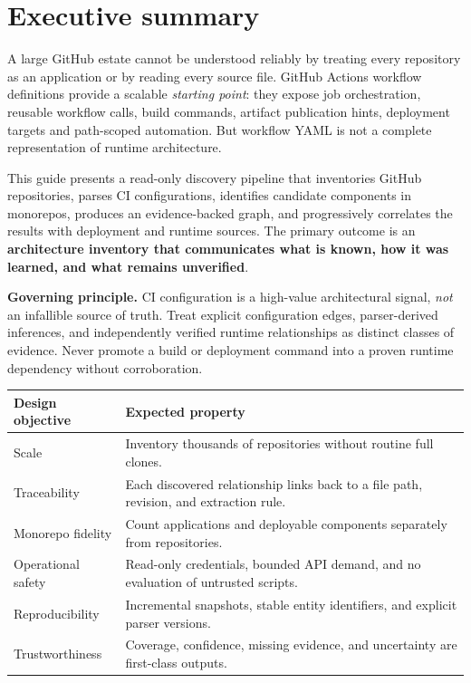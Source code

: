 \documentclass[11pt,letterpaper]{article}
\newcommand{\term}[1]{\textbf{\color{Navy}#1}}
\begin{document}
\section*{Executive summary}
A large GitHub estate cannot be understood reliably by treating every repository as an application or by reading every source file. GitHub Actions workflow definitions provide a scalable \emph{starting point}: they expose job orchestration, reusable workflow calls, build commands, artifact publication hints, deployment targets and path-scoped automation. But workflow YAML is not a complete representation of runtime architecture.

This guide presents a read-only discovery pipeline that inventories GitHub repositories, parses CI configurations, identifies candidate components in monorepos, produces an evidence-backed graph, and progressively correlates the results with deployment and runtime sources. The primary outcome is an \term{architecture inventory that communicates what is known, how it was learned, and what remains unverified}.

\begin{keypoint}
\textbf{Governing principle.} CI configuration is a high-value architectural signal, \emph{not} an infallible source of truth. Treat explicit configuration edges, parser-derived inferences, and independently verified runtime relationships as distinct classes of evidence. Never promote a build or deployment command into a proven runtime dependency without corroboration.
\end{keypoint}

\begin{tabularx}{\linewidth}{@{}P{1.7in}Y@{}}
\toprule
\textbf{Design objective} & \textbf{Expected property} \\
\midrule
Scale & Inventory thousands of repositories without routine full clones. \\
Traceability & Each discovered relationship links back to a file path, revision, and extraction rule. \\
Monorepo fidelity & Count applications and deployable components separately from repositories. \\
Operational safety & Read-only credentials, bounded API demand, and no evaluation of untrusted scripts. \\
Reproducibility & Incremental snapshots, stable entity identifiers, and explicit parser versions. \\
Trustworthiness & Coverage, confidence, missing evidence, and uncertainty are first-class outputs. \\
\bottomrule
\end{tabularx}
\end{document}
